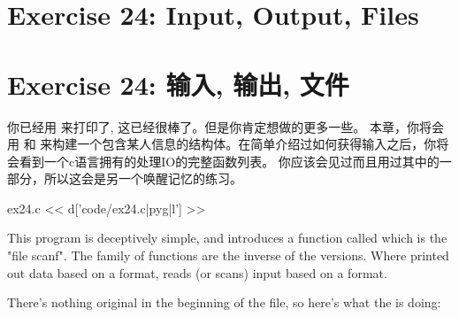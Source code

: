 \chapter{Exercise 24: Input, Output, Files}
\chapter{Exercise 24: 输入, 输出, 文件}

你已经用  来打印了, 这已经很棒了。但是你肯定想做的更多一些。 
 本章，你将会用  和  来构建一个包含某人信息的结构体。在简单介绍过如何获得输入之后，你将会看到一个c语言拥有的处理IO的完整函数列表。
你应该会见过而且用过其中的一部分，所以这会是另一个唤醒记忆的练习。

\begin{code}{ex24.c}
<< d['code/ex24.c|pyg|l'] >>
\end{code}

This program is deceptively simple, and introduces a function called
 which is the "file scanf".  The  family of
functions are the inverse of the  versions.  Where 
 printed out data based on a format,  reads
(or scans) input based on a format.

There's nothing original in the beginning of the file, so here's what
the  is doing:

